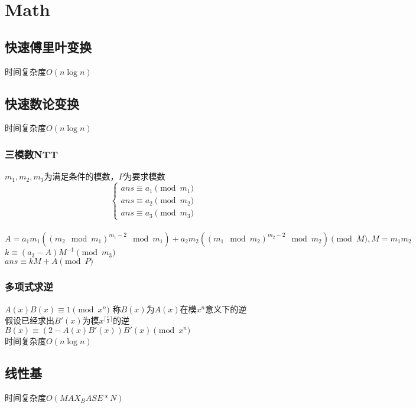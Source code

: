 \section{Math}

\subsection{快速傅里叶变换}
时间复杂度$O(n \log n)$\\


\subsection{快速数论变换}
时间复杂度$O(n\log n)$\\


\subsubsection{三模数NTT}
$m_1,m_2,m_3$为满足条件的模数，$P$为要求模数\\
$$
 \left\{
\begin{aligned}
ans \equiv a_1 \pmod{m_1} \\
ans \equiv a_2 \pmod{m_2} \\
ans \equiv a_3 \pmod{m_3}
\end{aligned}
\right.
$$\\
$A = a_1m_1((m_2 \mod m_1)^{m_1-2}\mod m_1) + a_2m_2((m_1 \mod m_2)^{m_2-2}\mod m_2) \pmod{M}, M = m_1m_2$\\
$k \equiv (a_3-A)M^{-1} \pmod{m_3}$\\
$ans \equiv kM + A \pmod{P}$\\



\subsubsection{多项式求逆}
$A(x)B(x)\equiv 1 \pmod{x^n}$ 称$B(x)$为$A(x)$在模$x^n$意义下的逆\\
假设已经求出$B'(x)$为模$x^{\lceil\frac{x}{2}\rceil}$的逆\\
$B(x)\equiv (2-A(x)B'(x))B'(x) \pmod{x^{n}}$\\
时间复杂度$O(n\log n)$\\


\subsection{线性基}
时间复杂度$O(MAX_BASE*N)$\\
